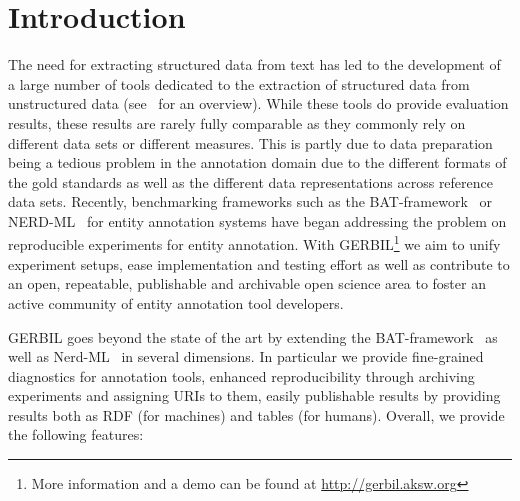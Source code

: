 \section{Introduction}
The need for extracting structured data from text has led to the development of a large number of tools dedicated to the extraction of structured data from unstructured data (see~\cite{GERBIL} for an overview).
While these tools do provide evaluation results, these results are rarely fully comparable as they commonly rely on different data sets or different measures. This is partly due to data preparation being a tedious problem in the annotation domain due to the different formats of the gold standards as well as the different data representations across reference data sets.
Recently, benchmarking frameworks such as the BAT-framework~\cite{cornolti} or NERD-ML~\cite{rizzo2014} for entity annotation systems have began addressing the problem on reproducible experiments for entity annotation.
With GERBIL\footnote{More information and a demo can be found at \url{http://gerbil.aksw.org}} 
 we aim to unify experiment setups, ease implementation and testing effort as well as contribute to an open, repeatable, publishable and archivable open science area to foster an active community of entity annotation tool developers. 

GERBIL goes beyond the state of the art by extending the BAT-framework~\cite{cornolti} as well as Nerd-ML~\cite{rizzo2014} in several dimensions. In particular we provide fine-grained diagnostics for annotation tools, enhanced reproducibility through archiving experiments and assigning URIs to them, easily publishable results by providing results both as RDF (for machines) and tables (for humans).
Overall, we provide the following features:


